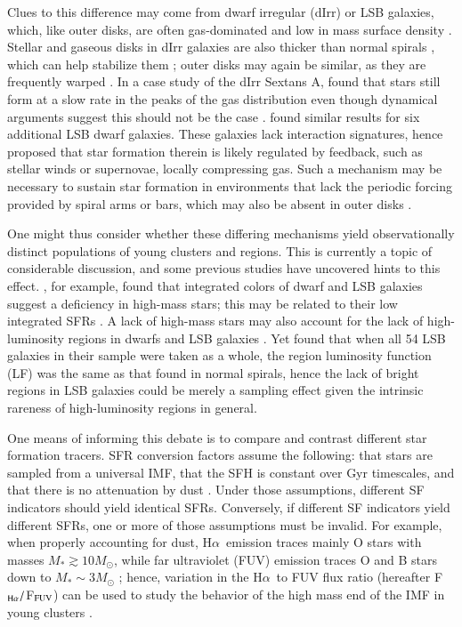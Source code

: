 \documentclass[iop]{emulateapj}
\newcommand{\ha}{H$\alpha$}
\newcommand{\hafuv}{F$_{\rm H\alpha}/$F$_{\rm FUV}$}
\begin{document}
Clues to this difference may come from dwarf irregular (dIrr) or LSB
galaxies, which, like outer disks, are often gas-dominated and low in
mass surface density \citep{mcgaugh97, vanzee97, hunter11}.  Stellar
and gaseous disks in dIrr galaxies are also thicker than normal
spirals \citep{elmegreen15}, which can help stabilize them
\citep{vandervoort70}; outer disks may again be similar, as they are
frequently warped \citep{sancisi76, vanderkruit87, bottema87,
  garcia02, vaneymeren11}.  In a case study of the dIrr Sextans A,
\citet{hunter96} found that stars still form at a slow rate in the
peaks of the gas distribution even though dynamical arguments suggest
this should not be the case \citep[e.g.][]{toomre64, kennicutt89}.
\citet[][]{vanzee97} found similar results for six additional LSB
dwarf galaxies.  These galaxies lack interaction signatures, hence
\citet{vanzee97} proposed that star formation therein is likely
regulated by feedback, such as stellar winds or supernovae, locally
compressing gas.  Such a mechanism may be necessary to sustain star
formation in environments that lack the periodic forcing provided by
spiral arms or bars, which may also be absent in outer disks
\citep{watkins16}.

One might thus consider whether these differing mechanisms yield
observationally distinct populations of young clusters and 
regions.  This is currently a topic of considerable discussion, and
some previous studies have uncovered hints to this effect.
\citet{hoversten08}, for example, found that integrated colors of
dwarf and LSB galaxies suggest a deficiency in high-mass stars; this
may be related to their low integrated SFRs \citep{gunawardhana11}.  A
lack of high-mass stars may also account for the lack of
high-luminosity  regions in dwarfs and LSB galaxies
\citep{helmboldt05, helmboldt09}.  Yet \citet{schombert13} found that
when all 54 LSB galaxies in their sample were taken as a whole, the
 region luminosity function (LF) was the same as that found
in normal spirals, hence the lack of bright  regions in LSB
galaxies could be merely a sampling effect given the intrinsic
rareness of high-luminosity  regions in general.

One means of informing this debate is to compare and contrast
different star formation tracers.  SFR conversion factors assume the
following: that stars are sampled from a universal IMF, that the SFH
is constant over Gyr timescales, and that there is no attenuation by
dust \citep{kennicutt83, donas87}.  Under those assumptions, different
SF indicators should yield identical SFRs.  Conversely, if
different SF indicators yield different SFRs, one or more of those
assumptions must be invalid.  For example, when properly accounting
for dust, \ha \ emission traces mainly O stars with masses $M_{*}
\gtrsim 10M_{\odot}$, while far ultraviolet (FUV) emission traces O
and B stars down to $M_{*} \sim 3M_{\odot}$ \citep{kennicutt12};
hence, variation in the \ha \ to FUV flux ratio (hereafter \hafuv) can
be used to study the behavior of the high mass end of the IMF in young
clusters \citep[e.g.][]{lee09}.
\end{document}
